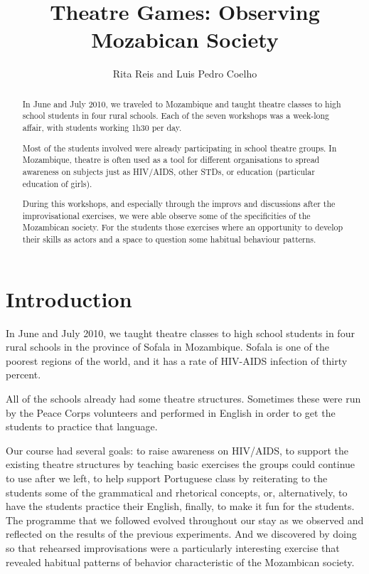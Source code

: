 \documentclass[article,twocolumn,twoside]{memoir}
\title{Theatre Games: Observing Mozabican Society}
\author{Rita Reis and Luis Pedro Coelho}
\begin{document}
\maketitle

\begin{abstract}


In June and July 2010, we traveled to Mozambique and taught theatre classes to
high school students in four rural schools. Each of the seven workshops was a
week-long affair, with students working 1h30 per day.

Most of the students involved were already participating in school theatre
groups. In Mozambique, theatre is often used as a tool for different
organisations to spread awareness on subjects just as HIV/AIDS, other STDs, or
education (particular education of girls).

During this workshops, and especially through the improvs and discussions after
the improvisational exercises, we were able observe some of the specificities
of the Mozambican society. For the students those exercises where an
opportunity to develop their skills as actors and a space to question some
habitual behaviour patterns.

\end{abstract}

\chapter{Introduction}
In June and July 2010, we taught theatre classes to high school students in four
rural schools in the province of Sofala in Mozambique. Sofala is one of the
poorest regions of the world, and it has a rate of HIV-AIDS infection of thirty
percent.

All of the schools already had some theatre structures. Sometimes these were
run by the Peace Corps volunteers and performed in English in order to get the
students to practice that language.

Our course had several goals: to raise awareness on HIV/AIDS, to support the
existing theatre structures by teaching basic exercises the groups could
continue to use after we left, to help support Portuguese class by reiterating
to the students some of the grammatical and rhetorical concepts, or,
alternatively, to have the students practice their English, finally, to make it
fun for the students. The programme that we followed evolved throughout our
stay as we observed and reflected on the results of the previous experiments.
And we discovered by doing so that rehearsed improvisations were a particularly
interesting exercise that revealed habitual patterns of behavior characteristic
of the Mozambican society.
\end{document}
